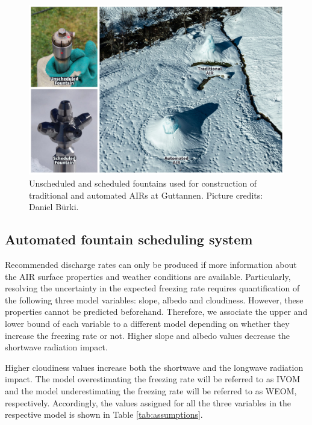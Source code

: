 \begin{figure}[htb]
	\includegraphics[width=\textwidth]{figs/AIR_fountains.jpg}
	\caption{Unscheduled and scheduled fountains used for construction of traditional and automated AIRs at
		Guttannen. Picture credits: Daniel Bürki.}
	\label{fig:autovsman}
\end{figure}

\subsection{Automated fountain scheduling system}


Recommended discharge rates can only be produced if more information about the AIR surface properties and
weather conditions are available. Particularly, resolving the uncertainty in the expected freezing rate requires
quantification of the following three model variables: slope, albedo and cloudiness. However, these properties cannot
be predicted beforehand. Therefore, we associate the upper and lower bound of each variable to a
different model depending on whether they increase the freezing rate or not. Higher slope and albedo values
decrease the shortwave radiation impact.


Higher cloudiness values increase both the shortwave and the longwave
radiation impact. The model overestimating the freezing rate will be referred to as \ac{IVOM} and the model
underestimating the freezing rate will be referred to as  \ac{WEOM}, respectively. Accordingly, the values
assigned for all the three variables in the respective model is shown in Table \ref{tab:assumptions}.

